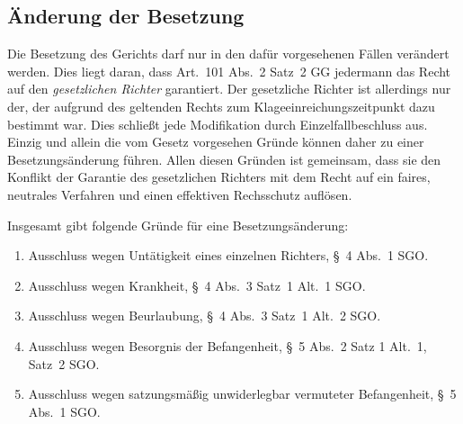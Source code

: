 \subsection{Änderung der Besetzung}
\label{Zusammensetzung:Spruchkoerper:Aenderung}
Die Besetzung des Gerichts darf nur in den dafür vorgesehenen Fällen verändert werden.
Dies liegt daran, dass Art.~101 Abs.~2 Satz~2 GG jedermann das Recht auf den \emph{gesetzlichen Richter} garantiert.
Der gesetzliche Richter ist allerdings nur der, der aufgrund des geltenden Rechts zum Klageeinreichungszeitpunkt dazu bestimmt war.
Dies schließt jede Modifikation durch Einzelfallbeschluss aus.
Einzig und allein die vom Gesetz vorgesehen Gründe können daher zu einer Besetzungsänderung führen.
Allen diesen Gründen ist gemeinsam, dass sie den Konflikt der Garantie des gesetzlichen Richters mit dem Recht auf ein faires, neutrales Verfahren und einen effektiven Rechsschutz auflösen.

Insgesamt gibt folgende Gründe für eine Besetzungsänderung:
\begin{enumerate}
\item Ausschluss wegen Untätigkeit eines einzelnen Richters, \S~4 Abs.~1 SGO.
\item Ausschluss wegen Krankheit, \S~4 Abs.~3 Satz~1 Alt.~1 SGO.
\item Ausschluss wegen Beurlaubung, \S~4 Abs.~3 Satz~1 Alt.~2 SGO.
\item Ausschluss wegen Besorgnis der Befangenheit, \S~5 Abs.~2 Satz 1 Alt.~1, Satz~2 SGO.
\item Ausschluss wegen satzungsmäßig unwiderlegbar vermuteter Befangenheit, \S~5 Abs.~1 SGO.
\end{enumerate}

